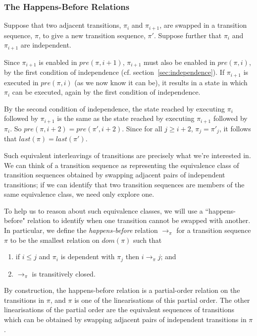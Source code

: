 \documentclass[12pt,a4paper,twoside,openright]{report}
\begin{document}
\subsubsection{The Happens-Before Relations}

Suppose that two adjacent transitions, $\pi_i$ and $\pi_{i+1}$,
are swapped in a
transition sequence, $\pi$, to give a new
transition sequence, $\pi'$. Suppose further
that $\pi_i$ and $\pi_{i+1}$ are independent.

Since $\pi_{i+1}$ is enabled in $\textit{pre}(\pi, i+1)$,
$\pi_{i+1}$ must also be enabled in $\textit{pre}(\pi, i)$,
by the first condition of independence
(cf. section~\ref{sec:independence}). If $\pi_{i+1}$
is executed in $\textit{pre}(\pi, i)$ (as we now know
it can be), it results in a state in which $\pi_i$
can be executed, again by the first condition of
independence.

By the second
condition of independence, the state reached by
executing $\pi_i$ followed by $\pi_{i+1}$ is the same
as the state reached by executing $\pi_{i+1}$ followed
by $\pi_i$.
So $\textit{pre}(\pi, i+2) = \textit{pre}(\pi', i+2)$. Since 
for all $j \geq i + 2$, $\pi_j = \pi'_j$, it follows that
$\textit{last}(\pi) = \textit{last}(\pi')$.

Such equivalent interleavings
of transitions are precisely what we're interested in.
We can think of a transition sequence as representing
the equivalence class of transition sequences obtained
by swapping adjacent pairs of independent transitions;
if we can identify that two transition sequences are
members of the same equivalence class, we need only
explore one.

To help us to reason about such equivalence classes,
we will use a ``happens-before" relation to identify
when one transition cannot be swapped with another.
In particular, we define the \emph{happens-before}
relation $\longrightarrow_\pi$ for a transition
sequence $\pi$ to be the smallest relation on
$\textit{dom}(\pi)$ such that
\begin{enumerate}
	\item if $i \leq j$ and $\pi_i$ is dependent with
		$\pi_j$ then $i \longrightarrow_\pi j$; and
	\item $\longrightarrow_\pi$ is transitively closed.
\end{enumerate}

By construction, the happens-before relation is a
partial-order relation on the transitions in $\pi$,
and $\pi$ is one of the linearisations of this
partial order. The other linearisations of the
partial order are the equivalent sequences of
transitions which can be obtained by swapping
adjacent pairs of independent transitions in $\pi$.
\end{document}
